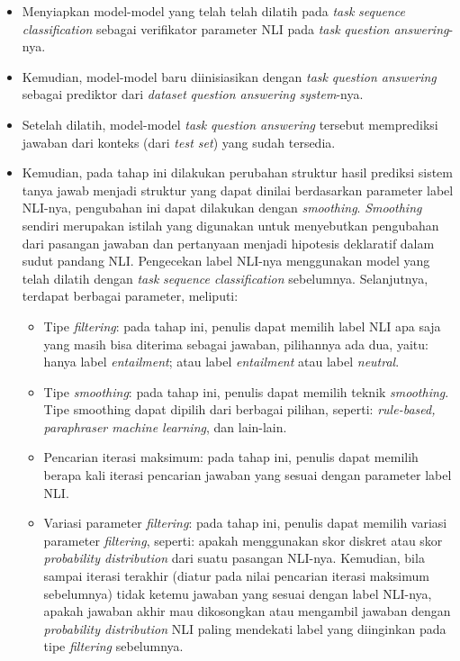 \begin{itemize}
    
    \item Menyiapkan model-model yang telah telah dilatih pada \emph{task} \emph{sequence classification} sebagai verifikator parameter NLI pada \emph{task} \emph{question answering}-nya.

    \item Kemudian, model-model baru diinisiasikan dengan \emph{task} \emph{question answering} sebagai prediktor dari \emph{dataset} \emph{question answering system}-nya.
    
    \item Setelah dilatih, model-model \emph{task} \emph{question answering} tersebut memprediksi jawaban dari konteks (dari \emph{test set}) yang sudah tersedia.
    
    \item Kemudian, pada tahap ini dilakukan perubahan struktur hasil prediksi sistem tanya jawab menjadi struktur yang dapat dinilai berdasarkan parameter label NLI-nya, pengubahan ini dapat dilakukan dengan \emph{smoothing}. \emph{Smoothing} sendiri merupakan istilah yang digunakan untuk menyebutkan pengubahan dari pasangan jawaban dan pertanyaan menjadi hipotesis deklaratif dalam sudut pandang NLI. Pengecekan label NLI-nya menggunakan model yang telah dilatih dengan \emph{task} \emph{sequence classification} sebelumnya. Selanjutnya, terdapat berbagai parameter, meliputi:
    
    \begin{itemize}
        
        \item Tipe \emph{filtering}: pada tahap ini, penulis dapat memilih label NLI apa saja yang masih bisa diterima sebagai jawaban, pilihannya ada dua, yaitu: hanya label \emph{entailment}; atau label \emph{entailment} atau label \emph{neutral}.
        
        \item Tipe \emph{smoothing}: pada tahap ini, penulis dapat memilih teknik \emph{smoothing}. Tipe smoothing dapat dipilih dari berbagai pilihan, seperti: \emph{rule-based, paraphraser machine learning}, dan lain-lain.
        
        \item Pencarian iterasi maksimum: pada tahap ini, penulis dapat memilih berapa kali iterasi pencarian jawaban yang sesuai dengan parameter label NLI.

        \item Variasi parameter \emph{filtering}: pada tahap ini, penulis dapat memilih variasi parameter \emph{filtering}, seperti: apakah menggunakan skor diskret atau skor \emph{probability distribution} dari suatu pasangan NLI-nya. Kemudian, bila sampai iterasi terakhir (diatur pada nilai pencarian iterasi maksimum sebelumnya) tidak ketemu jawaban yang sesuai dengan label NLI-nya, apakah jawaban akhir mau dikosongkan atau mengambil jawaban dengan \emph{probability distribution} NLI paling mendekati label yang diinginkan pada tipe \emph{filtering} sebelumnya.


\end{itemize}
\end{itemize}
